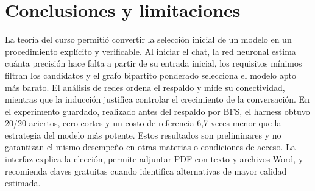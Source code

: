 \documentclass[12pt,letterpaper]{article}
\begin{document}
\section{Conclusiones y limitaciones}

La teoría del curso permitió convertir la selección inicial de un modelo en un procedimiento explícito y verificable. Al iniciar el chat, la red neuronal estima cuánta precisión hace falta a partir de su entrada inicial, los requisitos mínimos filtran los candidatos y el grafo bipartito ponderado selecciona el modelo apto más barato. El análisis de redes ordena el respaldo y mide su conectividad, mientras que la inducción justifica controlar el crecimiento de la conversación. En el experimento guardado, realizado antes del respaldo por BFS, el harness obtuvo 20/20 aciertos, cero cortes y un costo de referencia 6,7 veces menor que la estrategia del modelo más potente. Estos resultados son preliminares y no garantizan el mismo desempeño en otras materias o condiciones de acceso. La interfaz explica la elección, permite adjuntar PDF con texto y archivos Word, y recomienda claves gratuitas cuando identifica alternativas de mayor calidad estimada.
\end{document}
